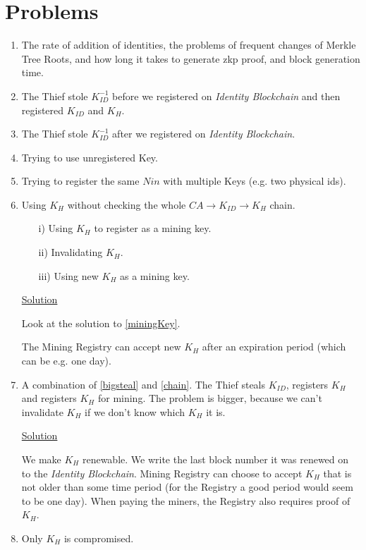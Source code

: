 \documentclass{article}
\newcommand{\khk}{K_{H}}
\newcommand{\kid}{K_{ID}}
\newcommand{\pbc}{\textit{Identity Blockchain}}
\begin{document}
\section{Problems}
\begin{enumerate}[label=\textbf{P\arabic*}]
\item The rate of addition of identities, the problems of frequent changes of Merkle Tree Roots, and how long it takes to generate zkp proof, and block generation time.
\item \label{bigsteal} The Thief stole $\kid^{-1}$ before we registered on \pbc{} and then registered $\kid$ and $\khk$.
\item The Thief stole $\kid^{-1}$ after we registered on \pbc.
\item Trying to use unregistered Key.
\item Trying to register the same $Nin$ with multiple Keys (e.g. two physical ids).
\item \label{chain} Using $\khk$ without checking the whole $CA\rightarrow \kid \rightarrow \khk$ chain.
  \begin{itemize}
    \item[i)] Using $\khk$ to register as a mining key.
    \item[ii)] Invalidating $\khk$.
    \item[iii)] Using new $\khk$ as a mining key.
  \end{itemize}
  \underline{Solution}

  Look at the solution to \ref{miningKey}.

  The Mining Registry can accept new $\khk$ after an expiration period (which can be e.g. one day).
\item \label{miningKey} A combination of \ref{bigsteal} and \ref{chain}. The Thief steals $\kid$, registers $\khk$ and registers $\khk$ for mining. The problem is bigger, because we can't invalidate $\khk$ if we don't know which $\khk$ it is.

  \underline{Solution}

  We make $\khk$ renewable. We write the last block number it was renewed on to the \pbc.
  Mining Registry can choose to accept $\khk$ that is not older than some time period (for the Registry a good period would seem to be one day).
  When paying the miners, the Registry also requires proof of $\khk$.
\item Only $\khk$ is compromised.
\end{enumerate}
\end{document}
